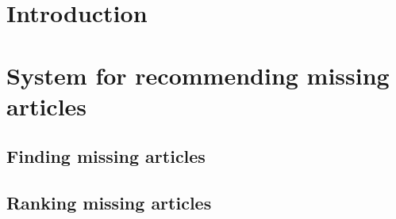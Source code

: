 \documentclass{sig-alternate-2013}
\begin{document}



\begin{abstract}

\end{abstract}





\section{Introduction}
\label{sec:intro}

\vspace{0.2cm}
%

\section{System for recommending missing articles}
\label{sec:overview}


\subsection{Finding missing articles}
\label{sec:missing}


\subsection{Ranking missing articles}
\label{sec:ranking}

\end{document}
